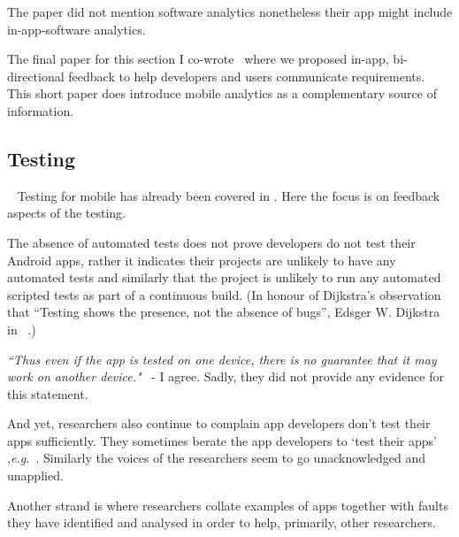 The paper did not mention software analytics nonetheless their app might include in-app-software analytics.

The final paper for this section I co-wrote~ where we proposed in-app, bi-directional feedback to help developers and users communicate requirements. This short paper does introduce mobile analytics as a complementary source of information. 


\subsection{Testing}~\label{rw-testing-topic}
Testing for mobile has already been covered in . Here the focus is on feedback aspects of the testing.

The absence of automated tests does not prove developers do not test their Android apps, rather it indicates their projects are unlikely to have any automated tests and similarly that the project is unlikely to run any automated scripted tests as part of a continuous build. (In honour of Dijkstra's observation that ``Testing shows the presence, not the absence of bugs'', Edsger W. Dijkstra in ~.) %



\emph{``Thus even if the app is tested on one device, there is no guarantee that it may work on another device."}~ - I agree. Sadly, they did not provide any evidence for this statement.

And yet, researchers also continue to complain app developers don't test their apps sufficiently. They sometimes berate the app developers to `test their apps' ,\emph{e.g.}~.
Similarly the voices of the researchers seem to go unacknowledged and unapplied.

Another strand is where researchers collate examples of apps together with faults they have identified and analysed in order to help, primarily, other researchers. 

